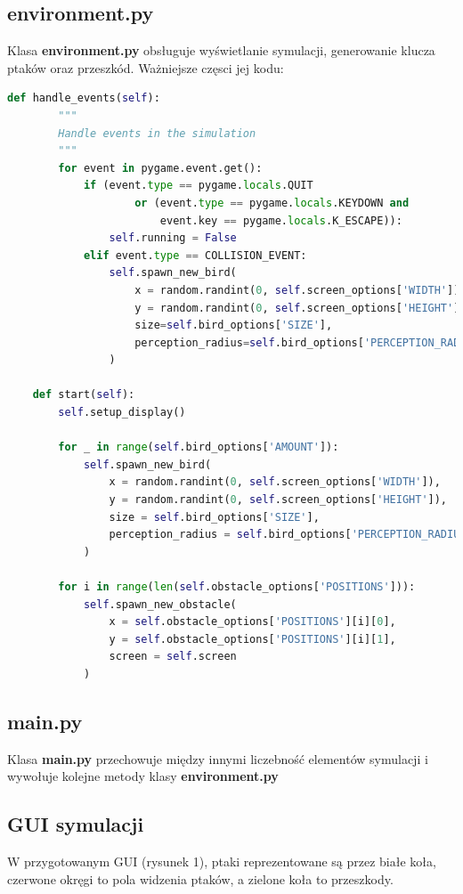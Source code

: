 \documentclass[12pt,a4paper,table]{article}
\begin{document}
    \subsection{environment.py}
    Klasa \textbf{environment.py} obsługuje wyświetlanie symulacji, generowanie klucza ptaków oraz przeszkód. Ważniejsze częsci jej kodu:
    \begin{lstlisting}[language=Python]
    def handle_events(self):
        """
        Handle events in the simulation
        """
        for event in pygame.event.get():
            if (event.type == pygame.locals.QUIT
                    or (event.type == pygame.locals.KEYDOWN and 
                        event.key == pygame.locals.K_ESCAPE)):
                self.running = False
            elif event.type == COLLISION_EVENT:
                self.spawn_new_bird(
                    x = random.randint(0, self.screen_options['WIDTH']),
                    y = random.randint(0, self.screen_options['HEIGHT']),
                    size=self.bird_options['SIZE'],
                    perception_radius=self.bird_options['PERCEPTION_RADIUS']
                )

    def start(self):
        self.setup_display()

        for _ in range(self.bird_options['AMOUNT']):
            self.spawn_new_bird(
                x = random.randint(0, self.screen_options['WIDTH']),
                y = random.randint(0, self.screen_options['HEIGHT']),
                size = self.bird_options['SIZE'],
                perception_radius = self.bird_options['PERCEPTION_RADIUS']
            )
        
        for i in range(len(self.obstacle_options['POSITIONS'])):
            self.spawn_new_obstacle(
                x = self.obstacle_options['POSITIONS'][i][0],
                y = self.obstacle_options['POSITIONS'][i][1],
                screen = self.screen
            )
    \end{lstlisting}
    
    \subsection{main.py}
    Klasa \textbf{main.py} przechowuje między innymi liczebność elementów symulacji i wywołuje kolejne metody klasy \textbf{environment.py}

    \subsection{GUI symulacji}
    W przygotowanym GUI (rysunek 1), ptaki reprezentowane są przez białe koła, czerwone okręgi to pola widzenia ptaków, a zielone koła to przeszkody.
    
\end{document}
